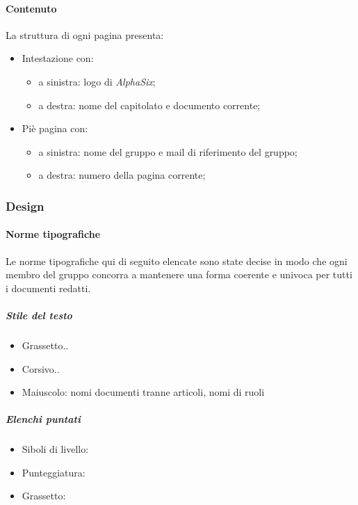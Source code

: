 			\paragraph{Contenuto}\label{PS:Documentazione:Struttura:Contenuto}
			La struttura di ogni pagina presenta:
			\begin{itemize}
				\item Intestazione con:
				\begin{itemize}
					\item a sinistra: logo di \textit{AlphaSix};
					\item a destra: nome del capitolato e documento corrente;		
				\end{itemize}
				 \item Piè pagina con:
				 \begin{itemize}
				 	\item a sinistra: nome del gruppo e mail di riferimento del gruppo;
				 	\item a destra: numero della pagina corrente;
				\end{itemize}	
			\end{itemize}
	
	
		\subsubsection{Design}\label{PS:Documentazione:Design}
		
			\paragraph{Norme tipografiche}\label{PS:Documentazione:Design:NormeT}
			Le norme tipografiche qui di seguito elencate sono state decise in modo che ogni membro del gruppo concorra a mantenere una forma coerente e univoca per tutti i documenti redatti.
			
			\subparagraph{Stile del testo}\label{PS:Documentazione:Design:NormeT:StileTesto}
			\begin{itemize}
				\item Grassetto..
				\item Corsivo..
				\item Maiuscolo: nomi documenti tranne articoli, nomi di ruoli
			\end{itemize}
		
			\subparagraph{Elenchi puntati}\label{PS:Documentazione:Design:NormeT:ElenchiPuntati}
			\begin{itemize}
				\item Siboli di livello:
				\item Punteggiatura:
				\item Grassetto:
			\end{itemize}
		
